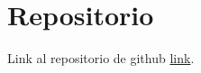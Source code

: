 \section{Repositorio}

Link al repositorio de github \textcolor{pucpRojo}{\href{https://github.com/PieroPastor/quantum-chess-player}{link}}.